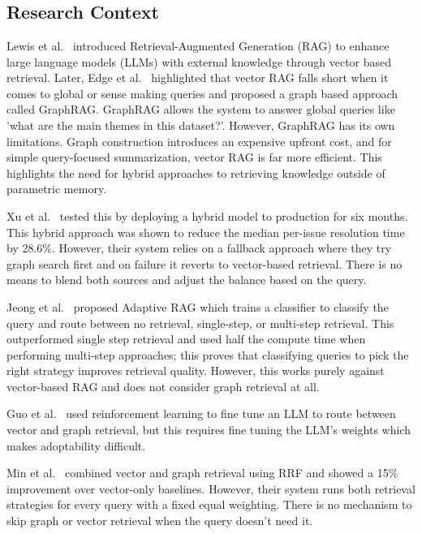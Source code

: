 \chapter{} 
\section{Research Context} 

Lewis et al.~\cite{10.5555/3495724.3496517} introduced Retrieval-Augmented Generation (RAG) to enhance large language models (LLMs) with external knowledge through vector based retrieval. Later, Edge et al.~\cite{edge2025localglobalgraphrag} highlighted that vector RAG falls short when it comes to global or sense making queries and proposed a graph based approach called GraphRAG. GraphRAG allows the system to answer global queries like 'what are the main themes in this dataset?'. However, GraphRAG has its own limitations. Graph construction introduces an expensive upfront cost, and for simple query-focused summarization, vector RAG is far more efficient. This highlights the need for hybrid approaches to retrieving knowledge outside of parametric memory. 

Xu et al.~\cite{Xu_2024} tested this by deploying a hybrid model to production for six months. This hybrid approach was shown to reduce the median per-issue resolution time by 28.6\%. However, their system relies on a fallback approach where they try graph search first and on failure it reverts to vector-based retrieval. There is no means to blend both sources and adjust the balance based on the query.  

Jeong et al.~\cite{jeong-etal-2024-adaptive} proposed Adaptive RAG which trains a classifier to classify the query and route between no retrieval, single-step, or multi-step retrieval. This outperformed single step retrieval and used half the compute time when performing multi-step approaches; this proves that classifying queries to pick the right strategy improves retrieval quality. However, this works purely against vector-based RAG and does not consider graph retrieval at all.  

Guo et al.~\cite{guo2025routeragefficientretrievalaugmentedgeneration} used reinforcement learning to fine tune an LLM to route between vector and graph retrieval, but this requires fine tuning the LLM's weights which makes adoptability difficult.  

Min et al.~\cite{min2025practicalgraphragefficientknowledge} combined vector and graph retrieval using RRF \cite{10.1145/1571941.1572114} and showed a 15\% improvement over vector-only baselines. However, their system runs both retrieval strategies for every query with a fixed equal weighting. There is no mechanism to skip graph or vector retrieval when the query doesn't need it. 

